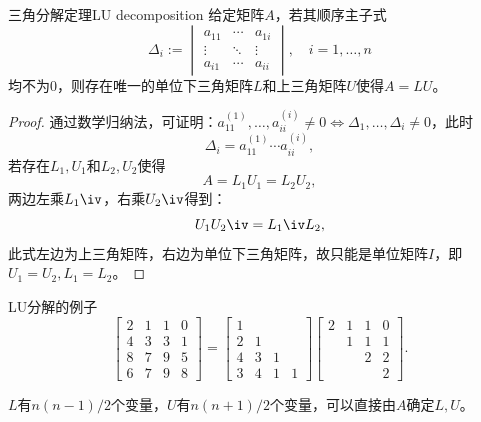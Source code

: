 \begin{theorem}
    {三角分解定理}{LU decomposition}
    给定矩阵$A$，若其顺序主子式
    \begin{equation}
        \Delta_i:=\begin{vmatrix}
            a_{11}&\cdots&a_{1i}\\
            \vdots&\ddots&\vdots\\
            a_{i1}&\cdots&a_{ii}
        \end{vmatrix},\quad i=1,\ldots,n
    \end{equation}
    均不为0，则存在唯一的单位下三角矩阵$L$和上三角矩阵$U$使得$A=LU$。
\end{theorem}
\begin{proof}
    通过数学归纳法，可证明：$a_{11}^{(1)},\ldots,a_{ii}^{(i)}\neq 0\iff\Delta_1,\ldots,\Delta_i\neq 0$，此时
    \begin{equation}
        \Delta_i=a_{11}^{(1)}\cdots a_{ii}^{(i)},
    \end{equation}
    若存在$L_1,U_1$和$L_2,U_2$使得
    \[
        A=L_1U_1=L_2U_2,
    \]
    两边左乘$L_1\iv$，右乘$U_2\iv$得到：
    \[
        U_1U_2\iv=L_1\iv L_2,
    \]
    此式左边为上三角矩阵，右边为单位下三角矩阵，故只能是单位矩阵$I$，即$U_1=U_2,L_1=L_2$。
\end{proof}

\begin{example}
    {LU分解的例子}{}
    \[
        \begin{bmatrix}
            2&1&1&0\\4&3&3&1\\8&7&9&5\\6&7&9&8
        \end{bmatrix}=\begin{bmatrix}
            1\\2&1\\4&3&1\\3&4&1&1
        \end{bmatrix}\begin{bmatrix}
            2&1&1&0\\ &1&1&1\\ &&2&2\\ &&&2
        \end{bmatrix}.
    \]
\end{example}

\begin{remark}
    $L$有$n(n-1)/2$个变量，$U$有$n(n+1)/2$个变量，可以直接由$A$确定$L,U$。
\end{remark}

